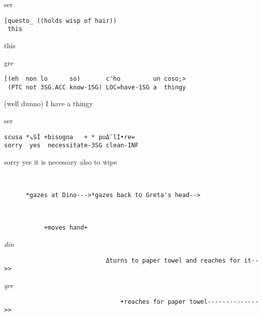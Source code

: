 \documentclass[output=paper,modfonts]{langscibook}
\begin{document}
\vspace{2mm}
%
\begin{transbox}{1}{ser}
\begin{verbatim}
[questo_ ((holds wisp of hair))
 this
\end{verbatim}
\hspace{0.07cm} this
\end{transbox}\vspace{2mm}
%
\begin{transbox}{2}{gre}
\begin{verbatim}
[(eh  non lo      so)       c'ho         un coso;>
 (PTC not 3SG.ACC know-1SG) LOC=have-1SG a  thingy
\end{verbatim}
\hspace{0.07cm} (well dunno) I have a thingy
\end{transbox}\vspace{1mm}
%
\begin{mdframednoverticalspace}[style=firstfoc]
\begin{transbox}{3}{ser}
\begin{verbatim}
scusa *↘SÌ +bisogna   + * puΔ¯lI•re=
sorry  yes  necessitate-3SG clean-INF 
\end{verbatim}
sorry yes it is necessary also to wipe
\end{transbox}
\end{mdframednoverticalspace}\vspace{1mm}
%
\begin{transbox}{4}{~}
\begin{verbatim}
      *gazes at Dino--->*gazes back to Greta's head-->
\end{verbatim}
\end{transbox}\vspace{-0.5mm}
%
\begin{transbox}{5}{~}
\begin{verbatim}
           +moves hand+
\end{verbatim}
\end{transbox}\vspace{-1.5mm}
%
\begin{mdframednoverticalspace}[style=secondfoc]
\begin{transbox}{6}{\textit{din}}
\begin{verbatim}
                            Δturns to paper towel and reaches for it-->>
\end{verbatim}
\end{transbox}
%
\begin{transbox}{7}{\textit{gre}}
\begin{verbatim}
                                •reaches for paper towel-------------->>
\end{verbatim}
\end{transbox}
\end{mdframednoverticalspace}
\end{document}
